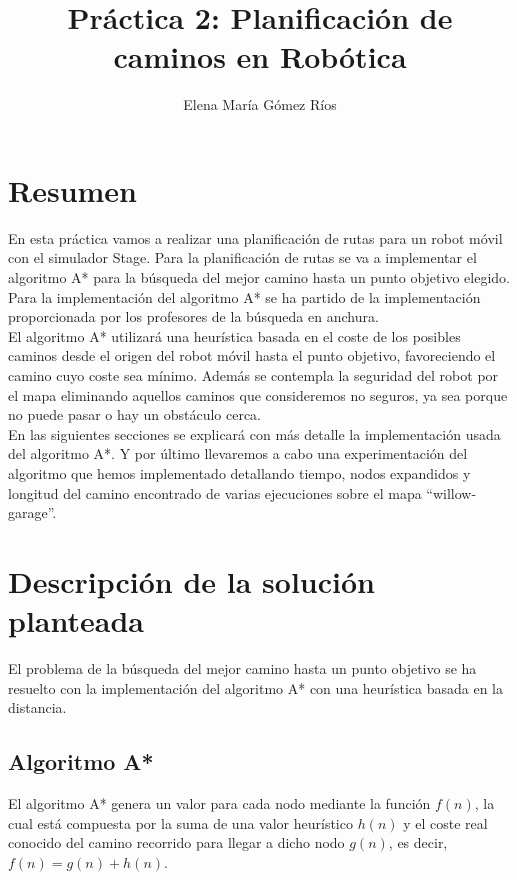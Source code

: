 \documentclass[12pt]{article}
\title{\vspace{5cm}
Práctica 2: Planificación de caminos en Robótica}
\author{ Elena María Gómez Ríos }
\begin{document}
\maketitle
\newpage

\section{Resumen}
En esta práctica vamos a realizar una planificación de rutas para un robot móvil con el simulador Stage. Para la planificación de rutas se va a implementar el algoritmo A* para la búsqueda del mejor camino hasta un punto objetivo elegido. Para la implementación del algoritmo A* se ha partido de la implementación proporcionada por los profesores de la búsqueda en anchura.\\

El algoritmo A* utilizará una heurística basada en el coste de los posibles caminos desde el origen del robot móvil hasta el punto objetivo, favoreciendo el camino cuyo coste sea mínimo. Además se contempla la seguridad del robot por el mapa eliminando aquellos caminos que consideremos no seguros, ya sea porque no puede pasar o hay un obstáculo cerca.\\

En las siguientes secciones se explicará con más detalle la implementación usada del algoritmo A*. Y por último llevaremos a cabo una experimentación del algoritmo que hemos implementado detallando tiempo, nodos expandidos y longitud del camino encontrado de varias ejecuciones sobre el mapa ``willow-garage''. 


\newpage


\section{Descripción de la solución planteada}

El problema de la búsqueda del mejor camino hasta un punto objetivo se ha resuelto con la implementación del algoritmo A* con una heurística basada en la distancia.

\subsection{Algoritmo A*}
El algoritmo A* genera un valor para cada nodo mediante la función $f(n)$, la cual está compuesta por la suma de una valor heurístico $h(n)$ y el coste real conocido del camino recorrido para llegar a dicho nodo $g(n)$, es decir, $f(n) = g(n)+h(n)$.\\
\end{document}
